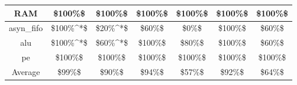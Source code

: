 \begin{tabular}{c|cc|cc|cc}
RAM & \color{black} {\cellcolor{lightblue}} \$100\%\$ & \color{black} {\cellcolor{lightgreen}} \$100\%\$ & \color{black} {\cellcolor{lightblue}} \$100\%\$ & \color{black} {\cellcolor{lightgreen}} \$100\%\$ & \color{black} {\cellcolor{lightblue}} \$100\%\$ & \color{black} {\cellcolor{lightgreen}} \$100\%\$ \\ \midrule
asyn\_fifo & \color{black} {\cellcolor{lightblue}} \$100\%^*\$ & \$20\%^*\$ & \$60\%\$ & \$0\%\$ & \color{black} {\cellcolor{lightblue}} \$100\%\$ & \color{black} {\cellcolor{lightgreen}} \$60\%\$ \\ \midrule
alu & \color{black} {\cellcolor{lightblue}} \$100\%^*\$ & \$60\%^*\$ & \color{black} {\cellcolor{lightblue}} \$100\%\$ & \color{black} {\cellcolor{lightgreen}} \$80\%\$ & \color{black} {\cellcolor{lightblue}} \$100\%\$ & \$60\%\$ \\ \midrule
pe & \color{black} {\cellcolor{lightblue}} \$100\%\$ & \color{black} {\cellcolor{lightgreen}} \$100\%\$ & \color{black} {\cellcolor{lightblue}} \$100\%\$ & \color{black} {\cellcolor{lightgreen}} \$100\%\$ & \color{black} {\cellcolor{lightblue}} \$100\%\$ & \color{black} {\cellcolor{lightgreen}} \$100\%\$ \\ \midrule
Average & \color{black} {\cellcolor{lightblue}} \$99\%\$ & \color{black} {\cellcolor{lightgreen}} \$90\%\$ & \$94\%\$ & \$57\%\$ & \$92\%\$ & \$64\%\$ \\
\bottomrule
\end{tabular}

